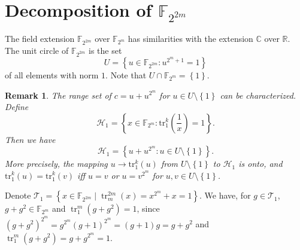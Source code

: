 \documentclass[8pt,oneside]{article}
\newcommand{\0}{\textbf{0}}
\newcommand{\1}{\textbf{1}}
\newcommand{\tr}{\mathrm{tr}_1^k}
\newcommand{\F}{\mathbb{F}}
\newcommand{\Com}{\mathbb{C}}
\newcommand{\R}{\mathbb{R}}
\newtheorem{remark}{Remark}
\begin{document}
\section{Decomposition of $ \F_{2^{2m}} $} 
    The field extension $ \F_{2^{2m}} $ over $ \F_{2^m} $ has similarities with the extension $ \Com $ over $ \R $.
    The unit circle of $ \F_{2^{2m}} $ is the set 
    \[U=\left\{ u\in\F_{2^{2m}}:u^{2^m+1}=1 \right\}\]
    of all elements with norm $ 1 $.
    Note that $ U\cap\F_{2^m}=\left\{ 1 \right\} $.
    \begin{remark}
        The range set of $ c=u+u^{2^m} $ for $ u\in U\setminus\left\{ 1 \right\} $ can be characterized. Define
        \[\mathcal{H}_1=\left\{ x\in\F_{2^m}:\tr(\frac{1}{x})=1 \right\}.\]
        Then we have 
        \[\mathcal{H}_1=\left\{ u+u^{2^m}:u\in U\setminus\left\{ 1 \right\} \right\}.\]
        More precisely, the mapping $ u\rightarrow\tr(u) $ from $ U\setminus\left\{ 1 \right\} $ to $ \mathcal{H}_1 $ 
        is onto, and $ \tr(u)=\tr(v) $ iff $ u=v $ or $ u=v^{2^m} $ for $ u,v\in U\setminus\left\{ 1 \right\} $. 
    \end{remark}
    Denote $ \mathcal{T}_1=\left\{ x\in\F_{2^{2m}}\mid \operatorname{tr}_m^{2m}(x)=x^{2^m}+x=1 \right\} $. 
    We have, for $ g\in\mathcal{T}_1 $, $ g+g^2\in\F_{2^m} $ and $ \operatorname{tr}_1^m(g+g^2)=1 $, 
    since $ (g+g^2)^{2^m}=g^{2^m}(g+1)^{2^m}=(g+1)g=g+g^2 $ and $ \operatorname{tr}_1^m(g+g^2)=g+g^{2^m}=1 $.
\end{document}
